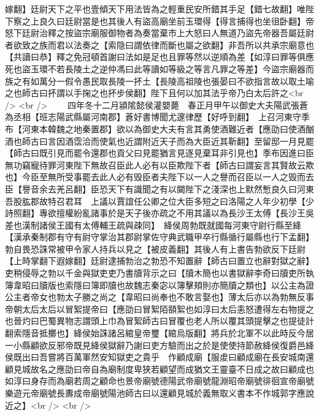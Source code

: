 嫁翻】廷尉天下之平也壹傾天下用法皆為之輕重民安所錯其手足【錯七故翻】唯陛下察之上良久曰廷尉當是也其後人有盜高廟坐前玉環得【得言捕得也坐徂卧翻】帝怒下廷尉治釋之按盜宗廟服御物者為奏當棄市上大怒曰人無道乃盜先帝器吾屬廷尉者欲致之族而君以法奏之【索隐曰謂依律而斷也屬之欲翻】非吾所以共承宗廟意也【共讀曰恭】釋之免冠頓首謝曰法如是足也且罪等然以逆順為差【如淳曰罪等俱應死也盜玉環不若長陵土之逆仲馮曰此等讀如等級之等言凡罪之等差】今盜宗廟器而族之有如萬分一假令愚民取長陵一抔土【長陵高祖陵也張晏曰不欲指言故以取土喻之也師古曰抔謂以手掬之也抔步侯翻】陛下且何以加其法乎帝乃白太后許之<br />
<br />
　　四年冬十二月潁隂懿侯灌嬰薨　春正月甲午以御史大夫陽武張蒼為丞相【班志陽武縣屬河南郡】蒼好書博聞尤邃律歷【好呼到翻】　上召河東守季布【河東本韓魏之地秦置郡】欲以為御史大夫有言其勇使酒難近者【應劭曰使酒酗酒也師古曰言因酒霑洽而使氣也近謂附近天子而為大臣近其靳翻】至留邸一月見罷【師古曰既引見而罷令還郡也貢父曰見罷猶言見逐見棄耳非引見也】季布因進曰臣無功竊寵待罪河東陛下無故召臣此人必有以臣欺陛下者【師古曰謂妄言其賢故云欺也】今臣至無所受事罷去此人必有毁臣者夫陛下以一人之譽而召臣以一人之毁而去臣【譽音余去羌呂翻】臣恐天下有識聞之有以闚陛下之淺深也上默然慙良久曰河東吾股肱郡故特召君耳　上議以賈誼任公卿之位大臣多短之曰洛陽之人年少初學【少詩照翻】專欲擅權紛亂諸事於是天子後亦疏之不用其議以為長沙王太傅【長沙王吳差也漢制諸侯王國有太傅輔王疏與疎同】　絳侯周勃既就國每河東守尉行縣至絳【漢承秦制郡有守有尉守掌治其郡尉掌佐守典武職甲卒行縣循行屬縣也行下孟翻】勃自畏恐誅常被甲令家人持兵以見之【被皮義翻】其後人有上書告勃欲反下廷尉【上時掌翻下遐嫁翻】廷尉逮捕勃治之勃恐不知置辭【師古曰置立也辭對獄之辭】吏稍侵辱之勃以千金與獄吏吏乃書牘背示之曰【牘木簡也以書獄辭李奇曰牘吏所執簿韋昭曰牘版也索隱曰簿即牘也故魏志秦宓以簿擊頬則亦簡牘之類也】以公主為證公主者帝女也勃太子勝之尚之【韋昭曰尚奉也不敢言娶也】薄太后亦以為勃無反事帝朝太后太后以冒絮提帝曰【應劭曰冒絮陌頟絮也如淳曰太后恚怒遭得左右物提之也晉灼曰巴蜀異物志謂頭上巾為冒絮師古曰冒覆也老人所以覆其頭提擊之也提徒計翻索隱音抵擲也】絳侯始誅諸呂綰皇帝璽【綰烏版翻】將兵於北軍不以此時反今居一小縣顧欲反邪帝既見絳侯獄辭乃謝曰吏方驗而出之於是使使持節赦絳侯復爵邑絳侯既出曰吾嘗將百萬軍然安知獄吏之貴乎　作顧成廟【服䖍曰顧成廟在長安城南還顧見城故名之應劭曰帝自為廟制度卑狭若顧望而成猶文王靈臺不日成之故曰顧成也如淳曰身存而為廟若周之顧命也景帝廟號德陽武帝廟號龍淵昭帝廟號徘徊宣帝廟號樂遊元帝廟號長夀成帝廟號陽池師古曰以還顧見城於義無取义書本不作城郭字應說近之】<br />
<br />
